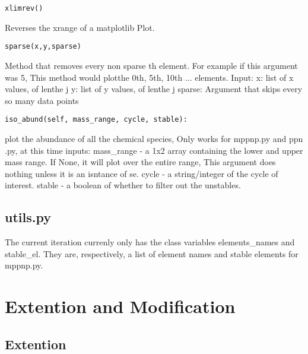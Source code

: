\begin{verbatim}
xlimrev()
\end{verbatim}
Reverses the xrange of a matplotlib Plot.\newline\newline
\begin{verbatim}
sparse(x,y,sparse)
\end{verbatim}
Method that removes every non sparse th element.  For example 
if this argument was 5, This method would plotthe 0th, 5th, 10th ... elements.\newline
Input:\newline
x: list of x values, of lenthe j\newline
y: list of y values, of lenthe j\newline
sparse: Argument that skips every so many data points\newline\newline
\begin{verbatim}
iso_abund(self, mass_range, cycle, stable):
\end{verbatim}
plot the abundance of all the chemical species, Only works for mppnp.py and ppn .py, at this time
inputs:
mass_range - a 1x2 array containing the lower and upper mass range. If None, it will plot over the entire range, This argument does nothing unless it is an isntance of se.\newline
cycle       - a string/integer of the cycle of interest. \newline
stable     - a boolean of whether to filter out the unstables. \newline\newline
\subsection{utils.py}
The current iteration currenly only has the class variables elements\_names and stable\_el.
They are, respectively, a list of element names and stable elements for mppnp.py.

\section{Extention and Modification}

\subsection{Extention}

